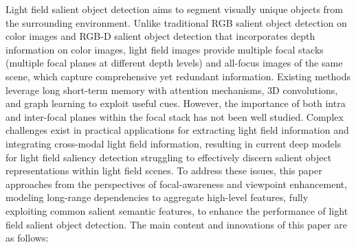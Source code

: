 \begin{englishabstract}
	
	
	
Light field salient object detection aims to segment visually unique objects from the surrounding environment.
Unlike traditional RGB salient object detection on color images and RGB-D salient object detection that incorporates depth information on color images,
light field images provide multiple focal stacks (multiple focal planes at different depth levels) and all-focus images of the same scene,
which capture comprehensive yet redundant information.
Existing methods leverage long short-term memory with attention mechanisms, 3D convolutions, and graph learning to exploit useful cues.
However, the importance of both intra and inter-focal planes within the focal stack has not been well studied.
Complex challenges exist in practical applications for extracting light field information and integrating cross-modal light field information,
resulting in current deep models for light field saliency detection struggling to effectively discern salient object representations within light field scenes.
To address these issues, this paper approaches from the perspectives of focal-awareness and viewpoint enhancement,
modeling long-range dependencies to aggregate high-level features, fully exploiting common salient semantic features,
to enhance the performance of light field salient object detection.
The main content and innovations of this paper are as follows:




\end{englishabstract}
